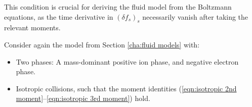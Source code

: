 
    This condition is crucial for deriving the fluid model from the Boltzmann equations, as the time derivative in $(\delta\!f_{s})_{s}$ necessarily vanish after taking the relevant moments.

    \line
    
    Consider again the model from Section \ref{cha:fluid models} with:
    \begin{itemize}
        \item  Two phases: A mass-dominant positive ion phase, and negative electron phase.
        \item  Isotropic collisions, such that the moment identities (\ref{eqn:isotropic 2nd moment}--\ref{eqn:isotropic 3rd moment}) hold.
    \end{itemize}

    \shortline

